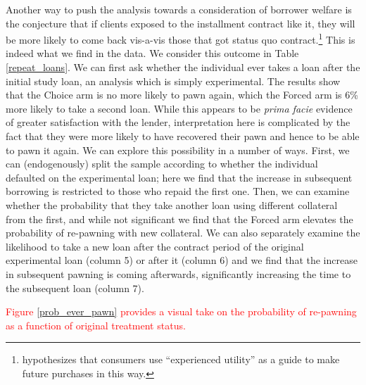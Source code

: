 \documentclass[oneside,11pt]{article}
\begin{document}
Another way to push the analysis towards a consideration of borrower welfare is the conjecture that if clients exposed to the installment contract like it, they will be more likely to come back vis-a-vis those that got status quo contract.\footnote{\cite{Laibson2018} hypothesizes that consumers use ``experienced utility'' as a guide to make future purchases in this way.} This is indeed what we find in the data.  We consider this outcome in Table \ref{repeat_loans}.  We can first ask whether the individual ever takes a loan after the initial study loan, an analysis which is simply experimental.  The results show that the Choice arm is no more likely to pawn again, which the Forced arm is 6\% more likely to take a second loan.  While this appears to be \textit{prima facie} evidence of greater satisfaction with the lender, interpretation here is complicated by the fact that they were more likely to have recovered their pawn and hence to be able to pawn it again.  We can explore this possibility in a number of ways.  First, we can (endogenously) split the sample according to whether the individual defaulted on the experimental loan; here we find that the increase in subsequent borrowing is restricted to those who repaid the first one.  Then, we can examine whether the probability that they take another loan using different collateral from the first, and while not significant we find that the Forced arm elevates the probability of re-pawning with new collateral.  We can also separately examine the likelihood to take a new loan after the contract period of the original experimental loan (column 5) or after it (column 6) and we find that the increase in subsequent pawning is coming afterwards, significantly increasing the time to the subsequent loan (column 7).  

\textcolor{red}{Figure \ref{prob_ever_pawn} provides a visual take on the probability of re-pawning as a function of original treatment status.}


\end{document}
